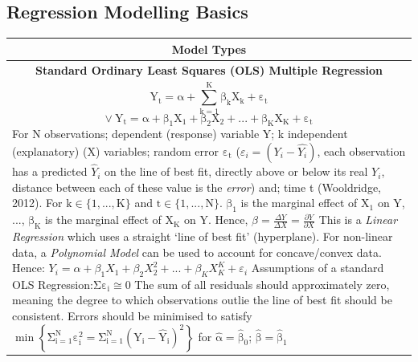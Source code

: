 \documentclass[11pt, english]{article}
\begin{document}
	\newpage

	\subsection{Regression Modelling Basics}

	\begin{center}
                \scriptsize
        \begin{longtable}{p{14cm}}
                \hline
                \hline
                \multicolumn{1}{c}{\textbf{Model Types}}\\
                \hline
                \hline
                \multicolumn{1}{c}{\textbf{Standard Ordinary Least Squares (OLS) Multiple Regression}}\\
                \hline
                $$\mathrm{Y_t=\alpha+\sum_{k=1}^K\beta_kX_k+\varepsilon_t}$$
                $$\mathrm{\lor\ Y_t=\alpha+\beta_1X_1+\beta_2X_2+...+\beta_KX_K+\varepsilon_t}$$
		For N observations; dependent (response) variable Y; k independent (explanatory) (X) variables; random error $\mathrm{\varepsilon_t}$ ($\varepsilon_i=(Y_i-\hat{Y_i})$, each observation has a predicted $\hat{Y}_i$ on the line of best fit, directly above or below its real $Y_i$, distance between each of these value is the \textit{error}) and; time t (Wooldridge, 2012). For $\mathrm{k\in\{1,...,K\}}$ and $\mathrm{t\in\{1,...,N\}}$.\newline\newline 
                $\mathrm{\beta_1}$ is the marginal effect of X$_1$ on Y, ..., $\mathrm{\beta_K}$ is the marginal effect of X$\mathrm{_K}$ on Y. Hence, $\beta=\frac{\Delta Y}{\Delta X}=\frac{\partial Y}{\partial X}$\newline\newline
		This is a \textit{Linear Regression} which uses a straight `line of best fit' (hyperplane). For non-linear data, a \textit{Polynomial Model} can be used to account for concave/convex data. Hence: $Y_i=\alpha+\beta_1X_1+\beta_2X_2^2+...+\beta_KX_K^K+\varepsilon_i$\newline\newline
                Assumptions of a standard OLS Regression:\newline\newline
                [1] $\mathrm{\Sigma\varepsilon_i\cong0}$\newline\newline
                The sum of all residuals should approximately zero, meaning the degree to which observations outlie the line of best fit should be consistent. Errors should be minimised to satisfy $\mathrm{\min\left\{\Sigma_{i=1}^N\varepsilon_i^2=\Sigma_{i=1}^N\left(Y_i-\hat{Y}_i\right)^2\right\}}$ for $\mathrm{\hat{\alpha}=\hat{\beta}_0}$; $\mathrm{\hat{\beta}=\hat{\beta}_1}$\newline\newline

\end{longtable}
\end{center}
\end{document}
